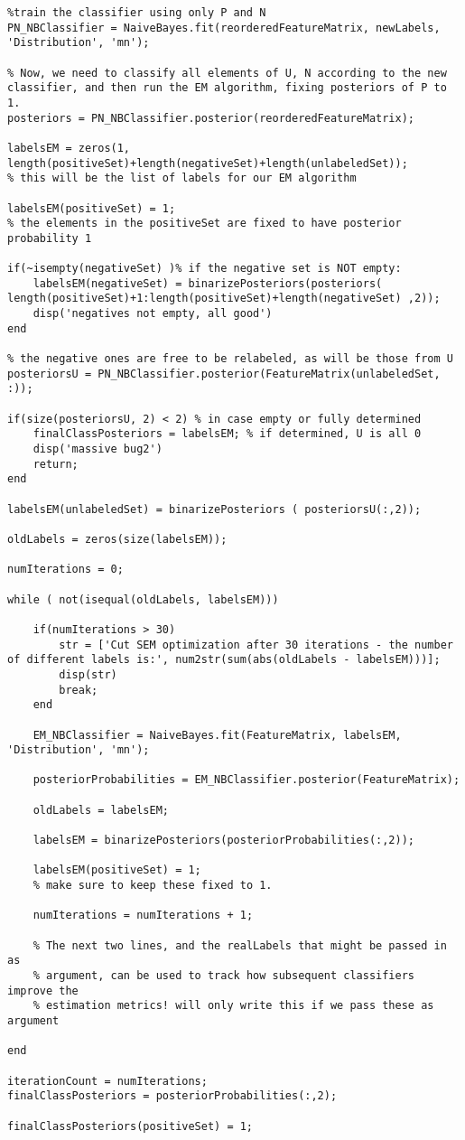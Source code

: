 \documentclass[12pt,twoside,notitlepage,amsart]{report} %
\begin{document}
\begin{lstlisting}
%train the classifier using only P and N
PN_NBClassifier = NaiveBayes.fit(reorderedFeatureMatrix, newLabels, 'Distribution', 'mn');

% Now, we need to classify all elements of U, N according to the new classifier, and then run the EM algorithm, fixing posteriors of P to 1.
posteriors = PN_NBClassifier.posterior(reorderedFeatureMatrix);

labelsEM = zeros(1, length(positiveSet)+length(negativeSet)+length(unlabeledSet));
% this will be the list of labels for our EM algorithm

labelsEM(positiveSet) = 1;
% the elements in the positiveSet are fixed to have posterior probability 1

if(~isempty(negativeSet) )% if the negative set is NOT empty:
    labelsEM(negativeSet) = binarizePosteriors(posteriors( length(positiveSet)+1:length(positiveSet)+length(negativeSet) ,2));
    disp('negatives not empty, all good')
end

% the negative ones are free to be relabeled, as will be those from U
posteriorsU = PN_NBClassifier.posterior(FeatureMatrix(unlabeledSet, :));

if(size(posteriorsU, 2) < 2) % in case empty or fully determined
    finalClassPosteriors = labelsEM; % if determined, U is all 0
    disp('massive bug2')
    return;
end
   
labelsEM(unlabeledSet) = binarizePosteriors ( posteriorsU(:,2));

oldLabels = zeros(size(labelsEM));

numIterations = 0;

while ( not(isequal(oldLabels, labelsEM)))

    if(numIterations > 30) 
        str = ['Cut SEM optimization after 30 iterations - the number of different labels is:', num2str(sum(abs(oldLabels - labelsEM)))];
        disp(str)
        break;
    end
    
    EM_NBClassifier = NaiveBayes.fit(FeatureMatrix, labelsEM, 'Distribution', 'mn');
    
    posteriorProbabilities = EM_NBClassifier.posterior(FeatureMatrix);
    
    oldLabels = labelsEM;
    
    labelsEM = binarizePosteriors(posteriorProbabilities(:,2));
    
    labelsEM(positiveSet) = 1;
    % make sure to keep these fixed to 1.
        
    numIterations = numIterations + 1;
    
    % The next two lines, and the realLabels that might be passed in as
    % argument, can be used to track how subsequent classifiers improve the
    % estimation metrics! will only write this if we pass these as argument
    
end

iterationCount = numIterations;
finalClassPosteriors = posteriorProbabilities(:,2);

finalClassPosteriors(positiveSet) = 1;

	\end{lstlisting}
\end{document}
